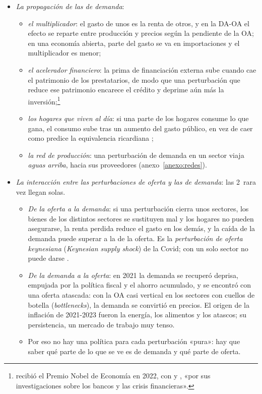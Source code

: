 \documentclass[11pt]{article}
\begin{document}
\begin{itemize}
\item \emph{La propagación de las de demanda}:
  \begin{itemize}
  \item \emph{el multiplicador}: el gasto de unos es la renta de otros, y en la DA-OA el efecto se reparte entre producción y precios según la pendiente de la OA; en una economía abierta, parte del gasto se va en importaciones y el multiplicador es menor;
  \item \emph{el acelerador financiero}: la prima de financiación externa sube cuando cae el patrimonio de los prestatarios, de modo que una perturbación que reduce ese patrimonio encarece el crédito y deprime aún más la inversión\nocite{BernankeGertlerGilchrist1999};\footnote{ recibió el Premio Nobel de Economía en 2022, con  y , «por sus investigaciones sobre los bancos y las crisis financieras»\nocite{Nobel2022Bancos}.}
  \item \emph{los hogares que viven al día}: si una parte de los hogares consume lo que gana, el consumo sube tras un aumento del gasto público, en vez de caer como predice la equivalencia ricardiana\nocite{GaliLopezSalidoValles2007} ;
  \item \emph{la red de producción}: una perturbación de demanda en un sector viaja \emph{aguas arriba}, hacia sus proveedores (anexo~\ref{anexo:redes}).
  \end{itemize}
\item \emph{La interacción entre las perturbaciones de oferta y las de demanda}: las 2~rara vez llegan solas.
  \begin{itemize}
  \item \emph{De la oferta a la demanda}: si una perturbación cierra unos sectores, los bienes de los distintos sectores se sustituyen mal y los hogares no pueden asegurarse, la renta perdida reduce el gasto en los demás, y la caída de la demanda puede superar a la de la oferta. Es la \emph{perturbación de oferta keynesiana} (\emph{Keynesian supply shock}) de la Covid; con un solo sector no puede darse\nocite{GuerrieriEtAl2022} .
  \item \emph{De la demanda a la oferta}: en 2021 la demanda se recuperó deprisa, empujada por la política fiscal y el ahorro acumulado, y se encontró con una oferta atascada: con la OA casi vertical en los sectores con cuellos de botella (\emph{bottlenecks}), la demanda se convirtió en precios. El origen de la inflación de 2021-2023 fueron la energía, los alimentos y los atascos; su persistencia, un mercado de trabajo muy tenso\nocite{BernankeBlanchard2025What}.
  \item Por eso no hay una política para cada perturbación «pura»: hay que saber qué parte de lo que se ve es de demanda y qué parte de oferta.
  \end{itemize}
\end{itemize}
\end{document}
